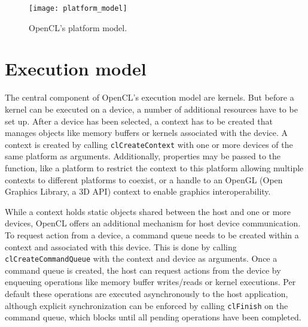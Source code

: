 \begin{figure} 
\centering
\texttt{[image: platform\_model]}
\caption{OpenCL's platform model.}
\label{fig:platform_model}
\end{figure}

\section{Execution model}
\label{sec:execution_model}
The central component of OpenCL's execution model are kernels. But before a kernel can be executed on a device, a number of additional resources have to be set up.
After a device has been selected, a context has to be created that manages objects like memory buffers or kernels associated with the device. A context is created by calling \lstinline!clCreateContext! with one or more devices of the same platform as arguments. Additionally, properties may be passed to the function, like a platform to restrict the context to this platform allowing multiple contexts to different platforms to coexist, or a handle to an OpenGL (Open Graphics Library, a 3D API) context to enable graphics interoperability. \cite[p.22]{opencl_book}

While a context holds static objects shared between the host and one or more devices, OpenCL offers an additional mechanism for host device communication. To request action from a device, a command queue needs to be created within a context and associated with this device. This is done by calling \lstinline!clCreateCommandQueue! with the context and device as arguments. Once a command queue is created, the host can request actions from the device by enqueuing operations like memory buffer writes/reads or kernel executions. Per default these operations are executed asynchronously to the host application, although explicit synchronization can be enforced by calling \lstinline!clFinish! on the command queue, which blocks until all pending operations have been completed. \cite[p.22, 23, 26]{opencl_book}

